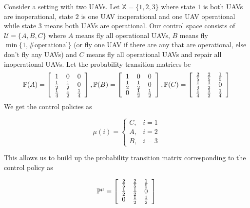 \begin{example}
Consider a setting with two UAVs.
Let $\mathbb{X}=\{1,2,3\}$ where state $1$ is both UAVs are inoperational, state $2$ is one UAV inoperational and one UAV operational while state $3$ means both UAVs are operational.
Our control space consists of $\mathcal{U} = \{A,B,C\}$ where $A$ means fly all operational UAVs, $B$ means fly $\min\{1, \#\text{operational}\}$ (or fly one UAV if there are any that are operational, else don't fly any UAVs) and $C$ means fly all operational UAVs and repair all inoperational UAVs.
Let the probability transition matrices be
\begin{align*}
\begin{split}
\mathbb{P}(A) = \left[\begin{array}{c c c} 1 & 0 & 0 \\ \frac{1}{2} & \frac{1}{2} & 0 \\ \frac{1}{4} & \frac{1}{2} & \frac{1}{4} \end{array}\right],
\mathbb{P} (B) = \left[\begin{array}{c c c} 1 & 0 & 0 \\ \frac{1}{2} & \frac{1}{2} & 0 \\ 0 & \frac{1}{2} & \frac{1}{2} \end{array}\right],
\mathbb{P} (C) = \left[\begin{array}{c c c} \frac{2}{5} & \frac{2}{5} & \frac{1}{5} \\ \frac{1}{4} & \frac{1}{2} & 0 \\ \frac{1}{4} & \frac{1}{2} & \frac{1}{4} \end{array}\right]
\end{split}
\end{align*}
We get the control policies as

\begin{equation*}
\mu(i) = \begin{cases} C, & i=1 \\ A, & i=2 \\ B, & i=3 \end{cases}
\end{equation*}

This allows us to build up the probability transition matrix corresponding to the control policy as

\begin{equation*}
\mathbb{P}^\mu = \left[\begin{array}{c c c} \frac{2}{5} & \frac{2}{5} & \frac{1}{5} \\ \frac{1}{2} & \frac{1}{2} & 0 \\ 0 & \frac{1}{2} & \frac{1}{2} \end{array}\right]
\end{equation*}


\end{example}
